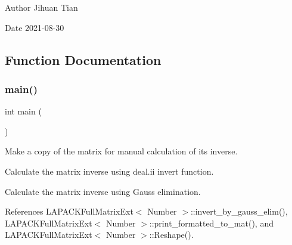 \begin{DoxyAuthor}{Author}
Jihuan Tian 
\end{DoxyAuthor}
\begin{DoxyDate}{Date}
2021-\/08-\/30 
\end{DoxyDate}


\subsection{Function Documentation}
\mbox{\label{lapack-matrix-inverse_8cc_ae66f6b31b5ad750f1fe042a706a4e3d4}} 
\subsubsection{\texorpdfstring{main()}{main()}}
{\footnotesize\ttfamily int main (\begin{DoxyParamCaption}{ }\end{DoxyParamCaption})}

Make a copy of the matrix for manual calculation of its inverse.

Calculate the matrix inverse using deal.\+ii {\ttfamily invert} function.

Calculate the matrix inverse using Gauss elimination.

References L\+A\+P\+A\+C\+K\+Full\+Matrix\+Ext$<$ Number $>$\+::invert\+\_\+by\+\_\+gauss\+\_\+elim(), L\+A\+P\+A\+C\+K\+Full\+Matrix\+Ext$<$ Number $>$\+::print\+\_\+formatted\+\_\+to\+\_\+mat(), and L\+A\+P\+A\+C\+K\+Full\+Matrix\+Ext$<$ Number $>$\+::\+Reshape().

